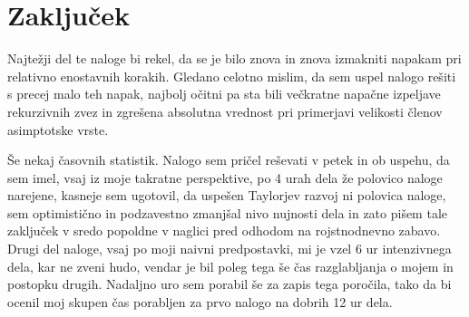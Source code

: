 \documentclass[12pt]{article}
\begin{document}
\newpage
\section{Zaključek}
Najtežji del te naloge bi rekel, da se je bilo znova in znova izmakniti napakam pri relativno enostavnih korakih. Gledano celotno mislim, da sem uspel nalogo rešiti s precej malo teh napak, najbolj očitni pa sta bili večkratne napačne izpeljave rekurzivnih zvez in zgrešena absolutna vrednost pri primerjavi velikosti členov asimptotske vrste.

\par
Še nekaj časovnih statistik. Nalogo sem pričel reševati v petek in ob uspehu, da sem imel, vsaj iz moje takratne perspektive, po 4 urah dela že polovico naloge narejene, kasneje sem ugotovil, da uspešen Taylorjev razvoj ni polovica naloge, sem optimistično in podzavestno zmanjšal nivo nujnosti dela in zato pišem tale zaključek v sredo popoldne v naglici pred odhodom na rojstnodnevno zabavo. Drugi del naloge, vsaj po moji naivni predpostavki, mi je vzel 6 ur intenzivnega dela, kar ne zveni hudo, vendar je bil poleg tega še čas razglabljanja o mojem in postopku drugih. Nadaljno uro sem porabil še za zapis tega poročila, tako da bi ocenil moj skupen čas porabljen za prvo nalogo na dobrih 12 ur dela.
\end{document}
